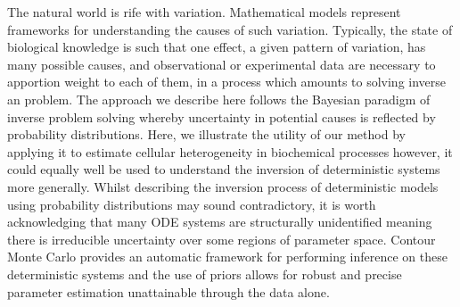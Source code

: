 The natural world is rife with variation. Mathematical models represent frameworks for understanding the causes of such variation. Typically, the state of biological knowledge is such that one effect, a given pattern of variation, has many possible causes, and observational or experimental data are necessary to apportion weight to each of them, in a process which amounts to solving inverse an problem. The approach we describe here follows the Bayesian paradigm of inverse problem solving whereby uncertainty in potential causes is reflected by probability distributions. Here, we illustrate the utility of our method by applying it to estimate cellular heterogeneity in biochemical processes however, it could equally well be used to understand the inversion of deterministic systems more generally. Whilst describing the inversion process of deterministic models using probability distributions may sound contradictory, it is worth acknowledging that many ODE systems are structurally unidentified meaning there is irreducible uncertainty over some regions of parameter space. Contour Monte Carlo provides an automatic framework for performing inference on these deterministic systems and the use of priors allows for robust and precise parameter estimation unattainable through the data alone.

